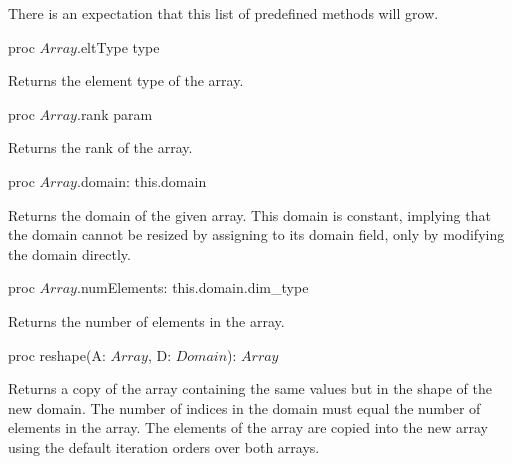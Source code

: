 There is an expectation that this list of predefined methods will grow.

\begin{protohead}
proc $Array$.eltType type
\end{protohead}
\begin{protobody}
Returns the element type of the array.
\end{protobody}

\begin{protohead}
proc $Array$.rank param
\end{protohead}
\begin{protobody}
Returns the rank of the array.
\end{protobody}

\begin{protohead}
proc $Array$.domain: this.domain
\end{protohead}
\begin{protobody}
Returns the domain of the given array.  This domain is constant,
implying that the domain cannot be resized by assigning to its domain
field, only by modifying the domain directly.
\end{protobody}

\begin{protohead}
proc $Array$.numElements: this.domain.dim_type
\end{protohead}
\begin{protobody}
Returns the number of elements in the array.
\end{protobody}

\begin{protohead}
proc reshape(A: $Array$, D: $Domain$): $Array$
\end{protohead}
\begin{protobody}
Returns a copy of the array containing the same values but in the
shape of the new domain.  The number of indices in the domain must
equal the number of elements in the array.  The elements of the array
are copied into the new array using the default iteration orders over
both arrays.
\end{protobody}
